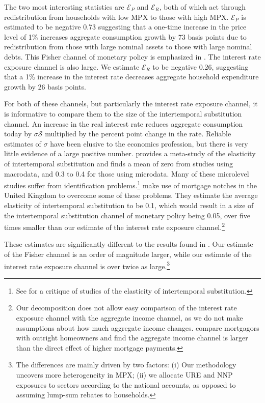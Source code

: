 \documentclass[titlepage]{\econtex}\newcommand{\texname}{ConsumptionHeterogeneity}
\begin{document}
	The two most interesting statistics are $\mathcal{E}_P$ and $\mathcal{E}_R$, both of which act through redistribution from households with low MPX to those with high MPX. $\mathcal{E}_P$ is estimated to be  negative 0.73 suggesting that a one-time increase in the price level of 1\% increases aggregate consumption growth by 73 basis points due to redistribution from those with large nominal assets to those with large nominal debts. This Fisher channel of monetary policy is emphasized in \cite{doepke_inflation_2006}. The interest rate exposure channel is also large. We estimate  $\mathcal{E}_R$ to be  negative 0.26, suggesting that a 1\% increase in the interest rate decreases aggregate household expenditure growth by 26 basis points.

	For both of these channels, but particularly the interest rate exposure channel, it is informative to compare them to the size of the intertemporal substitution channel. An increase in the real interest rate reduces aggregate consumption today by $\sigma \mathcal{S}$ multiplied by the percent point change in the rate. Reliable estimates of $\sigma$ have been elusive to the economics profession, but there is very little evidence of a large positive number. \cite{havranek_measuring_2015} provides a meta-study of the elasticity of intertemporal substitution and finds a mean of zero from studies using macrodata, and 0.3 to 0.4 for those using microdata. Many of these microlevel studies suffer from identification problems.\footnote{See \cite{carroll_death_2001} for a critique of studies of the elasticity of intertemporal substitution.} \cite{best_estimating_2018} make use of mortgage notches in the United Kingdom to overcome some of these problems. They estimate the average elasticity of intertemporal substitution to be 0.1, which would result in a size of the intertemporal substitution channel of monetary policy being 0.05, over five times smaller than our estimate of the interest rate exposure channel.\footnote{Our decomposition does not allow easy comparison of the interest rate exposure channel with the aggregate income channel, as we do not make assumptions about how much aggregate income changes. \cite{cloyne_monetary_2016} compare mortgagors with outright homeowners and find the aggregate income channel is larger than the direct effect of higher mortgage payments.}

	These estimates are significantly different to the results found in \cite{auclert_monetary_2017}. Our estimate of the Fisher channel is an order of magnitude larger, while our estimate of the interest rate exposure channel is over twice as large.\footnote{The differences are mainly driven by two factors: (i) Our methodology uncovers more heterogeneity in MPX; (ii) we allocate URE and NNP exposures to sectors according to the national accounts, as opposed to assuming lump-sum rebates to households.}
\end{document}
